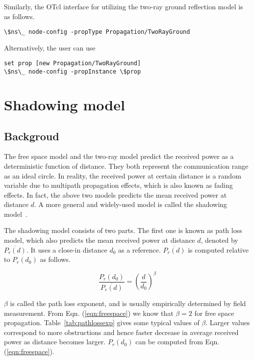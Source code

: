 Similarly, the OTcl interface for utilizing the two-ray ground reflection model
is as follows.

\begin{verbatim}
\$ns\_ node-config -propType Propagation/TwoRayGround
\end{verbatim}

Alternatively, the user can use

\begin{verbatim}
set prop [new Propagation/TwoRayGround]
\$ns\_ node-config -propInstance \$prop
\end{verbatim}


\section{Shadowing model}
\label{sec:shadowing}

\subsection{Backgroud}

The free space model and the two-ray model predict the received power
as a deterministic function of distance. They both represent the communication
range as an ideal circle. In reality, the received power at certain distance
is a random variable due to multipath propagation effects, which is also
known as fading effects. In fact, the above two models predicts the mean
received power at distance $d$. A more general and widely-used model is
called the shadowing model~\cite{Rappaport96}.

The shadowing model consists of two parts. The first one is known as path
loss model, which also predicts the mean received power at distance $d$,
denoted by $\overline{P_r(d)}$. It uses a close-in distance $d_0$ as
a reference. $\overline{P_r(d)}$ is computed relative to $P_r(d_0)$
as follows.

\begin{equation}
  \frac{P_r(d_0)}{\overline{P_r(d)}} = {\left( \frac{d}{d_0} \right)}^\beta
  \label{eqn:pathloss}
\end{equation}

$\beta$ is called the path loss exponent, and is usually empirically
determined by field measurement. From Eqn. (\ref{eqn:freespace}) we
know that $\beta = 2$ for free space propagation. Table~\ref{tab:pathlossexp}
gives some typical values of $\beta$.
Larger values correspond to more obstructions and hence faster
decrease in average received power as distance becomes larger. $P_r(d_0)$
can be computed from Eqn. (\ref{eqn:freespace}).

